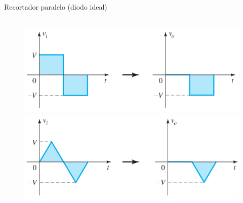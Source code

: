 \documentclass[t,aspectratio=169]{beamer}
\begin{document}
\begin{frame}{Recortador paralelo (diodo ideal)}
\begin{columns}
\begin{column}{0.5\textwidth}
\begin{figure}
    \centering
    \includegraphics[width=\textwidth]{figures/recortador_paralelo_ideal_1.png}
    \includegraphics[width=\textwidth]{figures/recortador_paralelo_ideal_2.png}
\end{figure}

\end{column}
\end{columns}

\end{frame}
\end{document}
